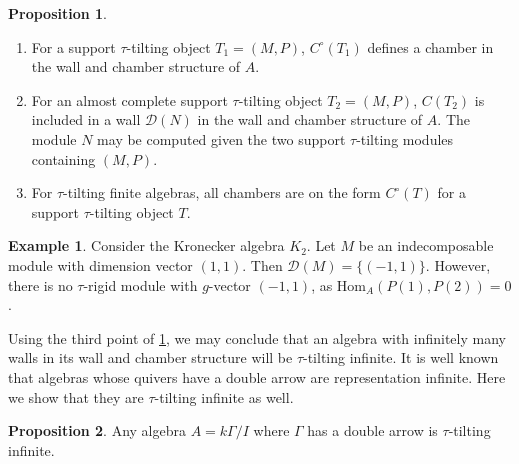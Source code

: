 \documentclass[]{article}
\theoremstyle{definition}
\newtheorem{proposition}{Proposition}[section]
\newtheorem{example}{Example}[section]
\newcommand{\tu}{\ensuremath{\tau}}
\begin{document}
\begin{proposition}\cite[Proposition 3.15, Corollary 3.16, Corollary 3.21]{Br_stle_2019}\label{tau-wall-chamber-result}
	\begin{enumerate}
		\item For a support \tu-tilting object $T_1 = (M,P)$, $C^\circ(T_1)$ defines a chamber in the wall and chamber structure of $A$.
		\item For an almost complete support \tu-tilting object $T_2 = (M,P)$, $C(T_2)$ is included in a wall $\mathcal{D}(N)$ in the wall and chamber structure of $A$. The module $N$ may be computed given the two support \tu-tilting modules containing $(M,P)$.
		\item For \tu-tilting finite algebras, all chambers are on the form $C^\circ(T)$ for a support \tu-tilting object $T$.
		
	\end{enumerate}
\end{proposition}


\begin{example}
	Consider the Kronecker algebra $K_2$. Let $M$ be an indecomposable module with dimension vector $(1,1)$. Then $\mathcal{D}(M) = \{(-1,1)\}$. However, there is no \tu-rigid module with $g$-vector $(-1,1)$, as $\text{Hom}_A(P(1),P(2)) = 0$.
\end{example}


Using the third point of \cref{tau-wall-chamber-result}, we may conclude that an algebra with infinitely many walls in its wall and chamber structure will be \tu-tilting infinite. It is well known that algebras whose quivers have a double arrow are representation infinite. Here we show that they are \tu-tilting infinite as well.
\begin{proposition}
	Any algebra $A = k\Gamma/I$ where $\Gamma$ has a double arrow is \tu-tilting infinite.
\end{proposition}
\end{document}
